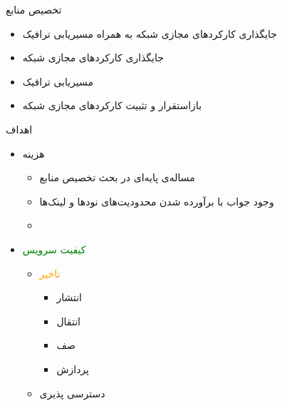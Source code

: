 \documentclass{beamer}
\makeatletter
\newcommand{\RTList}{\raggedleft\rightskip\@totalleftmargin}
\makeatother
\begin{document}
\begin{persian}
	\begin{frame}{تخصیص منابع}
		\begin{itemize}\RTList{}
			\justifying
			\item
			      جایگذاری کارکردهای مجازی شبکه به همراه مسیریابی ترافیک\\
			      \begin{center}\footnotesize{}\end{center}
			\item
			      جایگذاری کارکردهای مجازی شبکه\\
			      \begin{center}\footnotesize{}\end{center}
			\item
			      مسیریابی ترافیک\\
			      \begin{center}\footnotesize{}\end{center}
			\item
			      بازاستقرار و تثبیت کارکردهای مجازی شبکه\\
			      \begin{center}\footnotesize{}\end{center}
		\end{itemize}
	\end{frame}

	\begin{frame}{اهداف}
		\begin{itemize}\RTList{}
			\justifying
			\item هزینه
			      \begin{itemize}\RTList{}
				      \item مساله‌ی پایه‌ای در بحث تخصیص منابع
				      \item وجود جواب با برآورده شدن محدودیت‌های نودها و لینک‌ها
				      \item {}
			      \end{itemize}
			\item \textcolor{green}{کیفیت سرویس}
			      \begin{itemize}\RTList{}
				      \item \textcolor{orange}{تاخیر}
						\begin{itemize}\RTList{}
							\item انتشار
							\item انتقال
							\item صف
							\item پردازش
						\end{itemize}
				      \item دسترسی پذیری
			      \end{itemize}
		\end{itemize}
	\end{frame}


\end{persian}
\end{document}
